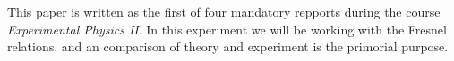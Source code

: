 This paper is written as the first of four mandatory repports during the course \emph{Experimental Physics II}. In this experiment we will be working with the Fresnel relations, and an comparison of theory and experiment is the primorial purpose.


